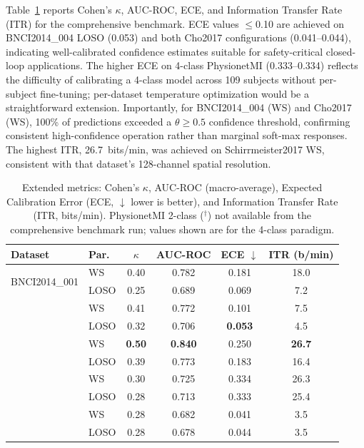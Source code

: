 \documentclass[11pt,a4paper]{article}
\begin{document}
Table~\ref{tab:extended} reports Cohen's $\kappa$, AUC-ROC, ECE, and
Information Transfer Rate (ITR) for the comprehensive benchmark.
ECE values $\leq$0.10 are achieved on BNCI2014\_004 LOSO (0.053) and
both Cho2017 configurations (0.041--0.044), indicating well-calibrated
confidence estimates suitable for safety-critical closed-loop applications.
The higher ECE on 4-class PhysionetMI (0.333--0.334) reflects the difficulty
of calibrating a 4-class model across 109 subjects without per-subject
fine-tuning; per-dataset temperature optimization would be a straightforward
extension.
Importantly, for BNCI2014\_004 (WS) and Cho2017 (WS), 100\% of predictions
exceeded a $\theta \geq 0.5$ confidence threshold, confirming consistent
high-confidence operation rather than marginal soft-max responses.
The highest ITR, 26.7~bits/min, was achieved on Schirrmeister2017 WS,
consistent with that dataset's 128-channel spatial resolution.

\begin{table}[ht]
\centering
\small
\caption{Extended metrics: Cohen's $\kappa$, AUC-ROC (macro-average),
Expected Calibration Error (ECE, $\downarrow$ lower is better),
and Information Transfer Rate (ITR, bits/min).
PhysionetMI 2-class ($^\dagger$) not available from the comprehensive benchmark
run; values shown are for the 4-class paradigm.}
\label{tab:extended}
\begin{tabular}{@{}llcccc@{}}
\toprule
\textbf{Dataset} & \textbf{Par.} & \textbf{$\kappa$} & \textbf{AUC-ROC} &
\textbf{ECE $\downarrow$} & \textbf{ITR (b/min)} \\
\midrule
\multirow{2}{*}{BNCI2014\_001}
 & WS   & 0.40 & 0.782 & 0.181 & 18.0 \\
 & LOSO & 0.25 & 0.689 & 0.069 & 7.2  \\
\addlinespace
\multirow{2}{*}{BNCI2014\_004}
 & WS   & 0.41 & 0.772 & 0.101 & 7.5  \\
 & LOSO & 0.32 & 0.706 & \textbf{0.053} & 4.5 \\
\addlinespace
\multirow{2}{*}{Schirrmeister2017}
 & WS   & \textbf{0.50} & \textbf{0.840} & 0.250 & \textbf{26.7} \\
 & LOSO & 0.39 & 0.773 & 0.183 & 16.4 \\
\addlinespace
\multirow{2}{*}{PhysionetMI (4-cl.)}
 & WS   & 0.30 & 0.725 & 0.334 & 26.3 \\
 & LOSO & 0.28 & 0.713 & 0.333 & 25.4 \\
\addlinespace
\multirow{2}{*}{Cho2017}
 & WS   & 0.28 & 0.682 & 0.041 & 3.5 \\
 & LOSO & 0.28 & 0.678 & 0.044 & 3.5 \\
\bottomrule
\end{tabular}
\end{table}
\end{document}

